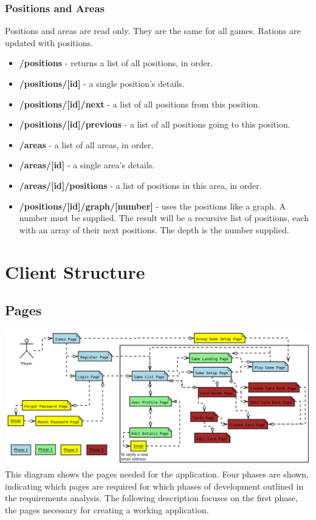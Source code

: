 \subsubsection{Positions and Areas}
Positions and areas are read only. They are the same for all games. Rations are updated with positions.
\begin{itemize}
	\item \textbf{/positions} - returns a list of all positions, in order.
	\item \textbf{/positions/[id]} - a single position's details.
	\item \textbf{/positions/[id]/next}  - a list of all positions from this position.
	\item \textbf{/positions/[id]/previous} - a list of all positions going to this position.
	\item \textbf{/areas} - a list of all areas, in order.
	\item \textbf{/areas/[id]} - a single area's details.
	\item \textbf{/areas/[id]/positions} - a list of positions in this area, in order.
	\item \textbf{/positions/[id]/graph/[number]} - uses the positions like a graph. A number must be supplied. The result will be a recursive list of positions, each with an array of their next positions. The depth is the number supplied.
\end{itemize}

\section{Client Structure}

\subsection{Pages}
\includegraphics[width=\textwidth]{Images/app3/pages}
This diagram shows the pages needed for the application. Four phases are shown, indicating which pages are required for which phases of development outlined in the requirements analysis. The following description focuses on the first phase, the pages necessary for creating a working application.

